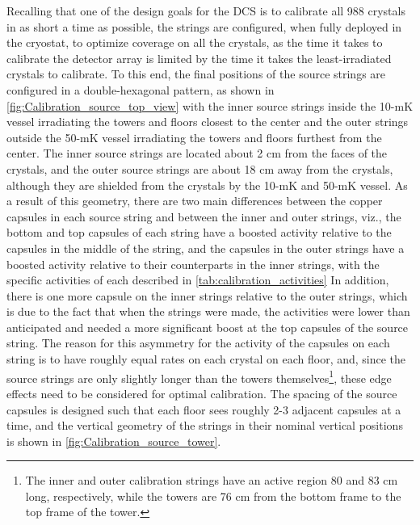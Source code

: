 Recalling that one of the design goals for the DCS is to calibrate all 988 crystals in as short a time as possible, the strings are configured, when fully deployed in the cryostat, to optimize coverage on all the crystals, as the time it takes to calibrate the detector array is limited by the time it takes the least-irradiated crystals to calibrate.
To this end, the final positions of the source strings are configured in a double-hexagonal pattern, as shown in \autoref{fig:Calibration_source_top_view} with the inner source strings inside the 10-mK vessel irradiating the towers and floors closest to the center and the outer strings outside the 50-mK vessel irradiating the towers and floors furthest from the center.
The inner source strings are located about 2 cm from the faces of the crystals, and the outer source strings are about 18 cm away from the crystals, although they are shielded from the crystals by the 10-mK and 50-mK vessel.
As a result of this geometry, there are two main differences between the copper capsules in each source string and between the inner and outer strings, viz., the bottom and top capsules of each string have a boosted activity relative to the capsules in the middle of the string, and the capsules in the outer strings have a boosted activity relative to their counterparts in the inner strings, with the specific activities of each described in \autoref{tab:calibration_activities}
In addition, there is one more capsule on the inner strings relative to the outer strings, which is due to the fact that when the strings were made, the activities were lower than anticipated and needed a more significant boost at the top capsules of the source string.
The reason for this asymmetry for the activity of the capsules on each string is to have roughly equal rates on each crystal on each floor, and, since the source strings are only slightly longer than the towers themselves\footnote{The inner and outer calibration strings have an active region 80 and 83 cm long, respectively, while the towers are 76 cm from the bottom frame to the top frame of the tower.}, these edge effects need to be considered for optimal calibration.
The spacing of the source capsules is designed such that each floor sees roughly 2-3 adjacent capsules at a time, and the vertical geometry of the strings in their nominal vertical positions is shown in \autoref{fig:Calibration_source_tower}.

